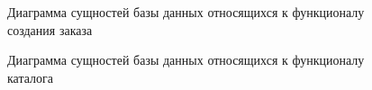 \documentclass[a4paper,article,14pt]{extarticle}
\begin{document}
\begin{figure}[ht]
\begin{center}
\caption{\label{dborder} Диаграмма сущностей базы данных относящихся к функционалу создания заказа}
\end {center}
\end {figure}

\begin{figure}[ht]
\begin{center}
\caption{\label{db_products} Диаграмма сущностей базы данных относящихся к функционалу каталога}
\end {center}
\end {figure}
\pagebreak
\end{document}
